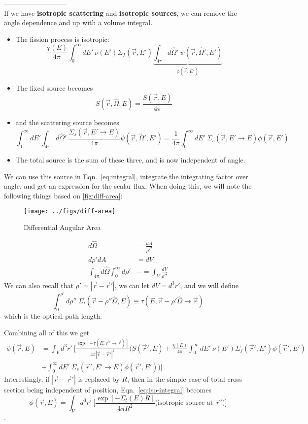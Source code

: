 \documentclass[12pt]{article}
\newcommand{\rvec}{\ensuremath{\vec{r}}}
\newcommand{\vOmega}{\ensuremath{\hat{\Omega}}}
\begin{document}
---------------------------\\
If we have \textbf{isotropic scattering} and \textbf{isotropic sources}, we can remove the angle dependence and up with a volume integral.
%
\begin{itemize}
\item The fission process is isotropic:
\[\frac{\chi(E)}{4\pi} \int_0^{\infty} dE' \: \nu(E') \Sigma_f(\rvec, E') \underbrace{\int_{4\pi} d\vOmega' \: \psi(\rvec, \vOmega', E')}_{\phi(\rvec,E')}\]
\item The fixed source becomes
\[S(\rvec, \vOmega, E) = \frac{S(\rvec, E)}{4 \pi}\]
\item and the scattering source becomes
\[\int_0^{\infty} dE' \int_{4\pi} d\vOmega' \: \frac{\Sigma_s(\rvec,E' \rightarrow E)}{4\pi} \psi(\rvec, \vOmega', E') = \frac{1}{4\pi}\int_0^{\infty} dE'\:\Sigma_s(\rvec,E' \rightarrow E) \phi(\rvec,E')\]
\item The total source is the sum of these three, and is now independent of angle.
\end{itemize}
%
We can use this source in Eqn.~\ref{eq:integral}, integrate the integrating factor over angle, and get an expression for the scalar flux. When doing this, we will note the following things based on \autoref{fig:diff-area}:
%
\begin{figure}[h]
\begin{center}
  \texttt{[image: ../figs/diff-area]}
  \caption{Differential Angular Area}
  \label{fig:diff-area}
\end{center}
\end{figure}
\begin{align*}
d\vOmega &= \frac{dA}{\rho'^2}\\
d\rho' dA &= dV \\
\int_{4\pi} d\vOmega \int_0^{\infty} d\rho' &-= \int_{V} \frac{dV}{\rho'^2}
\end{align*}
%
We can also recall that $\rho' = |\vec{r} - \vec{r}'|$, we can let $dV = d^3r'$, and we will define
\[\int_0^{\rho'} d\rho'' \: \Sigma_t(\rvec-\rho''\vOmega,E) \equiv \tau(E,\vec{r} - \rho' \vOmega \rightarrow \vec{r})
\]
which is the optical path length. 

Combining all of this we get
\begin{align}
\phi(\rvec,E) &= \int_V d^3r' \: \biggl[\frac{\exp[-\tau(E,\vec{r}' \rightarrow \vec{r})]}{4\pi|\vec{r} - \vec{r}'|^2} \biggl(S(\vec{r}',E) + \frac{\chi(E)}{4\pi} \int_0^{\infty} dE' \: \nu(E') \Sigma_f(\rvec', E')\phi(\vec{r}', E') \nonumber \\
&+ \int_0^{\infty} dE'\:\Sigma_s(\rvec',E' \rightarrow E) \phi(\rvec',E') \biggr)  \biggr]\:.
\label{eq:iso-integral}
\end{align}
%
Interestingly, if $|\vec{r} - \vec{r}'|$ is replaced by $R$, then in the simple case of total cross section being independent of position, Eqn.~\ref{eq:iso-integral} becomes
\[\phi(\rvec,E) = \int_V d^3r' \: \biggl[\frac{\exp[-\Sigma_t(E)R]}{4\pi R^2} \biggl( \text{isotropic source at }\vec{r}' \biggr)\biggr]\]\:.
\end{document}
